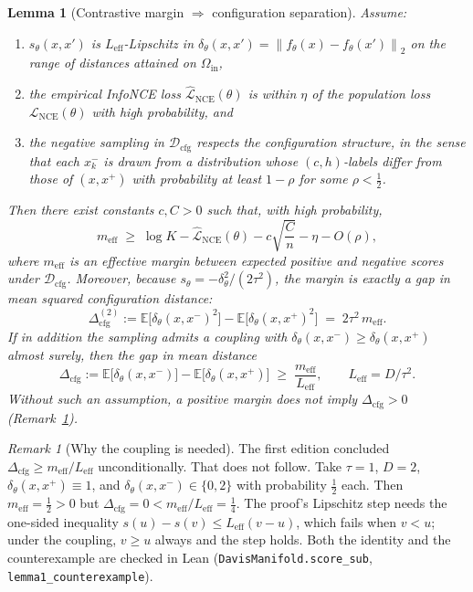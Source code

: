 \documentclass[11pt]{article}
\newcommand{\E}{\mathbb{E}}
\newcommand{\norm}[1]{\left\lVert #1 \right\rVert}
\newtheorem{lemma}{Lemma}
\theoremstyle{remark}
\newtheorem{remark}{Remark}
\theoremstyle{plain}
\begin{document}
\begin{lemma}[Contrastive margin $\Rightarrow$ configuration separation]
\label{lem:nce-separation}
Assume:
\begin{enumerate}[label=(B\arabic*),leftmargin=*]
  \item $s_\theta(x,x')$ is $L_{\mathrm{eff}}$-Lipschitz in
    $\delta_\theta(x,x') = \norm{f_\theta(x) - f_\theta(x')}_2$ on the range of distances attained
    on $\Omega_{\mathrm{in}}$,
  \item the empirical InfoNCE loss $\widehat{\mathcal{L}}_{\mathrm{NCE}}(\theta)$ is within $\eta$ of
    the population loss $\mathcal{L}_{\mathrm{NCE}}(\theta)$ with high probability, and
  \item the negative sampling in $\mathcal{D}_{\mathrm{cfg}}$ respects the configuration structure,
    in the sense that each $x^-_k$ is drawn from a distribution whose $(c,h)$-labels differ from
    those of $(x,x^+)$ with probability at least $1-\rho$ for some $\rho < \tfrac{1}{2}$.
\end{enumerate}
Then there exist constants $c,C>0$ such that, with high probability,
\[
m_{\mathrm{eff}}
\;\ge\;
\log K - \widehat{\mathcal{L}}_{\mathrm{NCE}}(\theta)
- c \sqrt{\frac{C}{n}} - \eta - O(\rho),
\]
where $m_{\mathrm{eff}}$ is an effective margin between expected positive and negative scores
under $\mathcal{D}_{\mathrm{cfg}}$. Moreover, because $s_\theta = -\delta_\theta^2/(2\tau^2)$, the margin is
exactly a gap in mean \emph{squared} configuration distance:
\[
\Delta^{(2)}_{\mathrm{cfg}}
:=
\E\bigl[ \delta_\theta(x,x^-)^2 \bigr]
-
\E\bigl[ \delta_\theta(x,x^+)^2 \bigr]
\;=\; 2\tau^2\, m_{\mathrm{eff}}.
\]
If in addition the sampling admits a coupling with $\delta_\theta(x,x^-) \ge \delta_\theta(x,x^+)$ almost
surely, then the gap in mean distance
\[
\Delta_{\mathrm{cfg}}
:=
\E\bigl[ \delta_\theta(x,x^-) \bigr]
-
\E\bigl[ \delta_\theta(x,x^+) \bigr]
\;\ge\; \frac{m_{\mathrm{eff}}}{L_{\mathrm{eff}}},
\qquad L_{\mathrm{eff}} = D/\tau^2 .
\]
Without such an assumption, a positive margin does not imply $\Delta_{\mathrm{cfg}} > 0$
(Remark~\ref{rem:lemma1-counterexample}).
\end{lemma}

\begin{remark}[Why the coupling is needed]\label{rem:lemma1-counterexample}
The first edition concluded $\Delta_{\mathrm{cfg}} \ge m_{\mathrm{eff}}/L_{\mathrm{eff}}$ unconditionally. That
does not follow. Take $\tau = 1$, $D = 2$, $\delta_\theta(x,x^+) \equiv 1$, and $\delta_\theta(x,x^-) \in \{0, 2\}$
with probability $\tfrac12$ each. Then $m_{\mathrm{eff}} = \tfrac12 > 0$ but $\Delta_{\mathrm{cfg}} = 0 <
m_{\mathrm{eff}}/L_{\mathrm{eff}} = \tfrac14$. The proof's Lipschitz step needs the one-sided inequality
$s(u) - s(v) \le L_{\mathrm{eff}}(v - u)$, which fails when $v < u$; under the coupling, $v \ge u$ always and the
step holds. Both the identity and the counterexample are checked in Lean
(\texttt{DavisManifold.score\_sub}, \texttt{lemma1\_counterexample}).
\end{remark}
\end{document}
